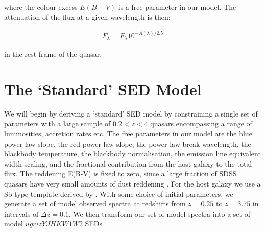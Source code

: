 where the colour excess $E(B-V)$ is a free parameter in our model. 
The attenuation of the flux at a given wavelength is then:

\begin{eqnarray}
  F_\lambda = F_\lambda10^{-A(\lambda)/2.5}
\end{eqnarray}

in the rest frame of the quasar. 

\section{The `Standard' SED Model} 


We will begin by deriving a `standard' SED model by constraining a single set of parameters with a large sample of $0.2 < z < 4$ quasars encompassing a range of luminosities, accretion rates etc. 
The free parameters in our model are the blue power-law slope, the red power-law slope, the power-law break wavelength, the blackbody temperature, the blackbody normalisation, the emission line equivalent width scaling, and the fractional contribution from the host galaxy to the total flux. 
The reddening E(B-V) is fixed to zero, since a large fraction of SDSS quasars have very small amounts of dust reddening \citep{richards03}. 
For the host galaxy we use a Sb-type template derived by \citet{mannucci01}. 
With some choice of initial parameters, we generate a set of model observed spectra at redshifts from $z=0.25$ to $z=3.75$ in intervals of $\Delta z = 0.1$. 
We then transform our set of model spectra into a set of model $ugrizYJHKW1W2$ SEDs 

